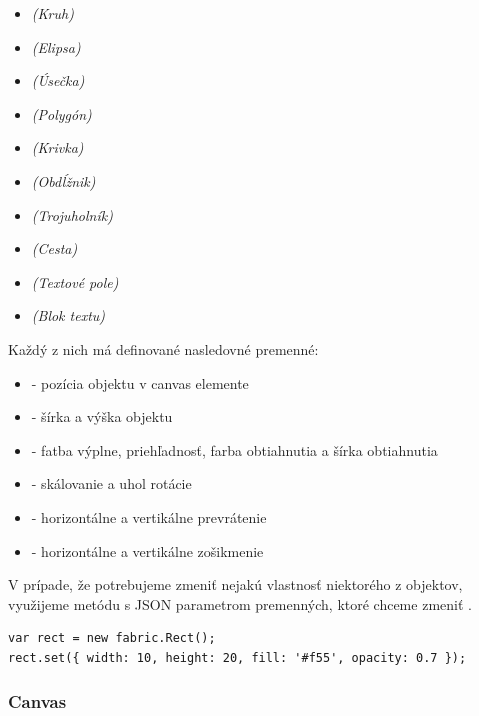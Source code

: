 \begin{itemize}
	\item {} \textit{(Kruh)} 
	\item {} \textit{(Elipsa)}
	\item {} \textit{(Úsečka)}
	\item {} \textit{(Polygón)}
	\item {} \textit{(Krivka)}
	\item {} \textit{(Obdĺžnik)}
	\item {} \textit{(Trojuholník)}
	\item {} \textit{(Cesta)}
	\item {} \textit{(Textové pole)}
	\item {} \textit{(Blok textu)}	
\end{itemize}  
Každý z nich má definované nasledovné premenné:
\begin{itemize}
	\item {} - pozícia objektu v canvas elemente 
	\item {} - šírka a výška objektu
	\item {} - fatba výplne, priehľadnosť, farba obtiahnutia a šírka obtiahnutia
	\item {} - skálovanie a uhol rotácie
	\item {} - horizontálne a vertikálne prevrátenie
	\item {} - horizontálne a vertikálne zošikmenie
\end{itemize}
V prípade, že potrebujeme zmeniť nejakú vlastnosť niektorého z objektov, využijeme metódu  s JSON parametrom premenných, ktoré chceme zmeniť .

\begin{lstlisting}[style=web,caption={Vytvorenie objektu typu obdĺžnik pomocou knižnice FabriJS a zmena jeho základných vlastností},captionpos=b, label={lst:fabric.set}]
var rect = new fabric.Rect(); 
rect.set({ width: 10, height: 20, fill: '#f55', opacity: 0.7 }); 
\end{lstlisting}


\subsubsection{Canvas}


